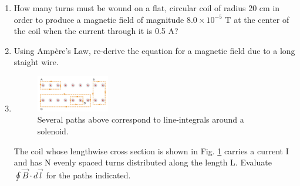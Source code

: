 \documentclass[10pt]{article}
\begin{document}
\begin{enumerate}
\begin{enumerate}
\item How many turns must be wound on a flat, circular coil of radius 20 cm in order to produce a magnetic field of magnitude $8.0 \times 10^{-5}$ T at the center of the coil when the current through it is 0.5 A? \\ \vspace{1.5cm}
\item Using Amp\`{e}re's Law, re-derive the equation for a magnetic field due to a long staight wire. \\ \vspace{3cm}
\item
\begin{figure}[hb]
\centering
\includegraphics[width=0.3\textwidth]{circuit2.png}
\caption{\label{fig:circuit2} Several paths above correspond to line-integrals around a solenoid.}
\end{figure}
The coil whose lengthwise cross section is shown in Fig. \ref{fig:circuit2} carries a current I and has N evenly spaced turns distributed along the length L. Evaluate $\oint \vec{B} \cdot d\vec{l}$ for the paths indicated.
\end{enumerate}
\end{enumerate}
\end{document}
